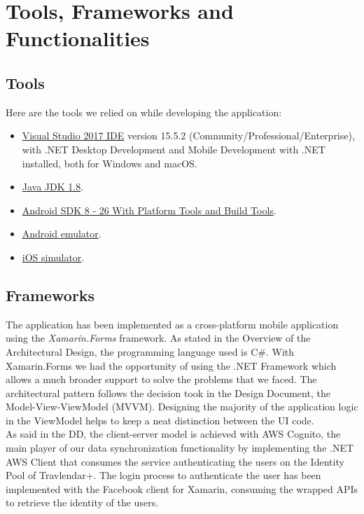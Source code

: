 \chapter{Tools, Frameworks and Functionalities}
\label{cha:framworks}

\section{Tools}
\label{sec:tools}
Here are the tools we relied on while developing the application:
\begin{itemize}
\item \href{https://www.visualstudio.com/downloads/}{Visual Studio 2017 IDE} version 15.5.2 (Community/Professional/Enterprise), with .NET Desktop Development and Mobile Development with .NET installed, both for Windows and macOS.
\item \href{http://www.oracle.com/technetwork/java/javase/downloads/jdk8-downloads-2133151.html}{Java JDK 1.8}.
\item \href{https://developer.android.com/studio/releases/platform-tools.html}{Android SDK 8 - 26 With Platform Tools and Build Tools}.
\item \href{https://developer.android.com/studio/releases/platform-tools.html}{Android emulator}.
\item \href{https://developer.apple.com/library/content/documentation/IDEs/Conceptual/iOS_Simulator_Guide/Introduction/Introduction.html}{iOS simulator}.
\end{itemize}


\section{Frameworks}
The application has been implemented as a cross-platform mobile application using the \textit{Xamarin.Forms} framework. As stated in the Overview of the Architectural Design, the programming language used is C\#. With Xamarin.Forms we had the opportunity of using the .NET Framework which allows a much broader support to solve the problems that we faced. The architectural pattern follows the decision took in the Design Document, the Model-View-ViewModel (MVVM). Designing the majority of the application logic in the ViewModel helps to keep a neat distinction between the UI code.\\ 

As said in the DD, the client-server model is achieved with AWS Cognito, the main player of our data synchronization functionality by implementing the .NET AWS Client that consumes the service authenticating the users on the Identity Pool of Travlendar+. The login process to authenticate the user has been implemented with the Facebook client for Xamarin, consuming the wrapped APIs to retrieve the identity of the users. \\

